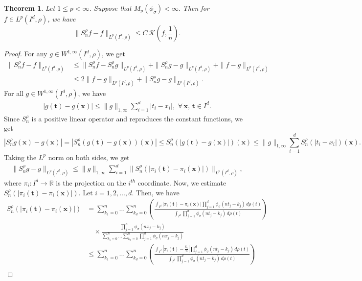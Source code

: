 \documentclass[12pt, reqno]{amsart}
\numberwithin{equation}{section}
\newtheorem{theorem}{Theorem}[section]
\theoremstyle{definition}
\theoremstyle{remark}
\numberwithin{equation}{section}
\newcommand{\R}{\mathbb{R}}
\newcommand{\X}{\mathbf{x}}
\newcommand{\LP}{L^p(I^d, \rho)}
\begin{document}
\begin{theorem} 
    Let $1\leq p<\infty$. Suppose that $M_p(\phi_\sigma)<\infty.$ Then for $f\in \LP$, we have
    $$\|S^{\rho}_nf-f\|_{\LP}\leq C\,\mathcal{K}\left(f,\frac{1}{n}\right). $$
\end{theorem}
\begin{proof} %
For any $g\in W^{1,\infty}(I^d,\rho)$, we get
\begin{align}
\|S^{\rho}_nf-f\|_{\LP} &\leq \|S^{\rho}_nf-S^{\rho}_ng\|_{\LP}+\|S^{\rho}_ng-g\|_{\LP}+\|f-g\|_{\LP} \nonumber \\
 &\leq 2 \|f-g\|_{\LP}+\|S^{\rho}_ng-g\|_{\LP}. \label{mKesti}
\end{align}
For all $g\in W^{1,\infty}(I^d,\rho)$, we have \begin{align}
|g(\mathbf{t})-g(\mathbf{x})|\leq \|g\|_{1,\infty}\sum_{i=1}^d|t_i-x_i|, \,\, \forall \, \X,\,\mathbf{t}\in  I^d.\end{align}
Since $S^{\rho}_n$ is a positive linear operator and reproduces the constant functions, we get
$$|S^{\rho}_ng(\mathbf{x})-g(\mathbf{x})|=|S^{\rho}_n(g(\mathbf{t})-g(\mathbf{x}))(\mathbf{x})|\leq S^{\rho}_n(|g(\mathbf{t})-g(\mathbf{x})|)(\mathbf{x})\leq \|g\|_{1,\infty}\sum_{i=1}^d S^{\rho}_n(|t_i-x_i|)(\mathbf{x}).$$
 Taking the $L^p$ norm on both sides, we get
 \begin{align}
     \|S^{\rho}_ng-g\|_{\LP}  \leq \|g\|_{1,\infty} \sum_{i=1}^d \|S^{\rho}_n(|\pi_i(\mathbf{t})-\pi_i(\X)|)\|_{\LP}, \label{mgesti}
 \end{align}
where $\pi_i:I^d\to\R$ is the projection on the $i^{th}$ coordinate. Now, we estimate  $S^{\rho}_n(|\pi_i(\mathbf{t})-\pi_i(\X)|).$
Let $i=1,2,\ldots,d.$ Then, we have
\begin{align*}
S^{\rho}_n(|\pi_i(\mathbf{t})-\pi_i(\X)|) &=   \sum_{k_1=0}^n \ldots \sum_{k_d=0}^n \left( \frac{\int_{I^d} |\pi_i(\mathbf{t})-\pi_i(\X)| \prod_{j=1}^d \phi_\sigma(nt_j - k_j) \, d\rho(t)}{\int_{I^d} \prod_{j=1}^d \phi_\sigma(nt_j - k_j) \, d\rho(t)} \right) \\
&\quad  \times \frac{\prod_{j=1}^d \phi_\sigma(nx_j - k_j)}{\sum_{k_1=0}^n \ldots \sum_{k_d=0}^n \prod_{j=1}^d \phi_\sigma(nx_j - k_j)}   \\
&\leq   \sum_{k_1=0}^n \ldots \sum_{k_d=0}^n \left( \frac{\int_{I^d} |\pi_i(\mathbf{t}) - \frac{k_i}{n}| \prod_{j=1}^d \phi_\sigma(nt_j - k_j) \, d\rho(t)}{\int_{I^d} \prod_{j=1}^d \phi_\sigma(nt_j - k_j) \, d\rho(t)} \right)  \\

\end{align*}
\end{proof}
\end{document}
